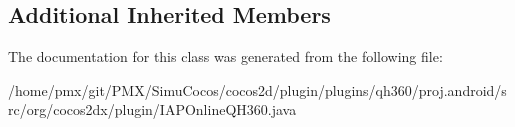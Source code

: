 \subsection*{Additional Inherited Members}


The documentation for this class was generated from the following file\+:\begin{DoxyCompactItemize}
\item 
/home/pmx/git/\+P\+M\+X/\+Simu\+Cocos/cocos2d/plugin/plugins/qh360/proj.\+android/src/org/cocos2dx/plugin/I\+A\+P\+Online\+Q\+H360.\+java\end{DoxyCompactItemize}

